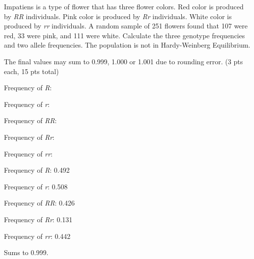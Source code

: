 
\question[15]
Impatiens is a type of flower that has three flower colors. Red color is produced by \textit{RR} individuals. Pink color is produced by \textit{Rr} individuals. White color is produced by \textit{rr} individuals. A random sample of 251 flowers found that 107 were red, 33 were pink, and 111 were white. Calculate the three genotype frequencies and two allele frequencies. The population is not in Hardy-Weinberg Equilibrium.

 The final values may sum to 0.999, 1.000 or 1.001 due to rounding error. (3 pts each, 15 pts total)

\vspace{2\baselineskip}
Frequency of \textit{R}:

\vspace{2\baselineskip}
Frequency of \textit{r}:

\vspace{2\baselineskip}
Frequency of \textit{RR}:

\vspace{2\baselineskip}
Frequency of \textit{Rr}:

\vspace{2\baselineskip}
Frequency of \textit{rr}: 

\begin{solution}

\vspace{2\baselineskip}
Frequency of \textit{R}: 0.492

\vspace{\baselineskip}
Frequency of \textit{r}: 0.508

\vspace{\baselineskip}
Frequency of \textit{RR}: 0.426

\vspace{\baselineskip}
Frequency of \textit{Rr}: 0.131

\vspace{\baselineskip}
Frequency of \textit{rr}: 0.442

\vspace{\baselineskip}
Sums to 0.999.
\end{solution}